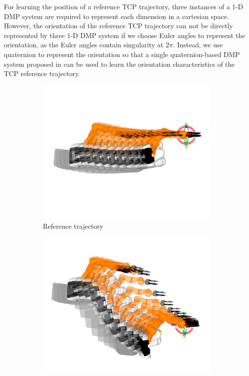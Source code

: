 For learning the position of a reference TCP trajectory, three instances of a 1-D DMP system are required to represent each dimension in a cartesian space. However, the orientation of the reference TCP trajectory can not be directly represented by three 1-D DMP system if we choose Euler angles to represent the orientation, as the Euler angles contain singularity at $2\pi$. Instead, we use quaternion to represent the orientation so that a single quaternion-based DMP system proposed in \cite{Pastor2011} can be used to learn the orientation characteristics of the TCP reference trajectory. 

\begin{figure}[!htbp] 
\centering
\begin{subfigure}[t]{.3\linewidth}
  \centering
  \includegraphics[width=1\linewidth]{figure/dmp_origin.png}
  \caption{Reference trajectory}
  \label{fig:sub1}
\end{subfigure}
\begin{subfigure}[t]{.3\linewidth}
  \centering
  \includegraphics[width=1\linewidth]{figure/dmp_goal_changed.png}

\end{subfigure}
\end{figure}
